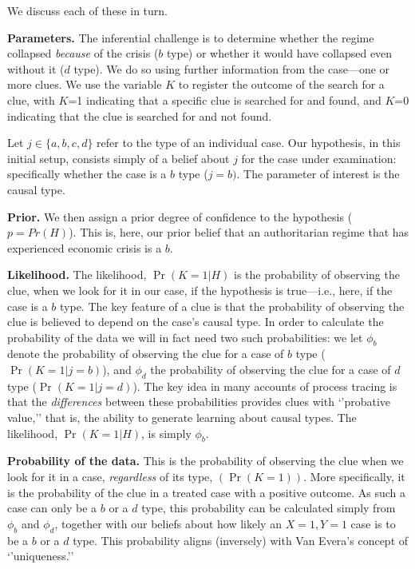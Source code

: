 \documentclass[
  12pt,
]{book}
\begin{document}
We discuss each of these in turn.

\textbf{Parameters.} The inferential challenge is to determine whether the regime collapsed \emph{because} of the crisis (\(b\) type) or whether it would have collapsed even without it (\(d\) type). We do so using further information from the case---one or more clues. We use the variable \(K\) to register the outcome of the search for a clue, with \(K\)=1 indicating that a specific clue is searched for and found, and \(K\)=0 indicating that the clue is searched for and not found.

Let \(j\in \{a,b,c,d\}\) refer to the type of an individual case. Our hypothesis, in this initial setup, consists simply of a belief about \(j\) for the case under examination: specifically whether the case is a \(b\) type (\(j=b)\). The parameter of interest is the causal type.

\textbf{Prior.} We then assign a prior degree of confidence to the hypothesis (\(p = Pr(H)\)). This is, here, our prior belief that an authoritarian regime that has experienced economic crisis is a \(b\).

\textbf{Likelihood.} The likelihood, \(\Pr(K=1|H)\) is the probability of observing the clue, when we look for it in our case, if the hypothesis is true---i.e., here, if the case is a \(b\) type. The key feature of a clue is that the probability of observing the clue is believed to depend on the case's causal type. In order to calculate the probability of the data we will in fact need two such probabilities: we let \(\phi_b\) denote the probability of observing the clue for a case of \(b\) type (\(\Pr(K=1|j=b)\)), and \(\phi_d\) the probability of observing the clue for a case of \(d\) type (\(\Pr(K=1|j=d)\)). The key idea in many accounts of process tracing is that the \emph{differences} between these probabilities provides clues with `'probative value,'' that is, the ability to generate learning about causal types. The likelihood, \(\Pr(K=1|H)\), is simply \(\phi_b\).

\textbf{Probability of the data.} This is the probability of observing the clue when we look for it in a case, \emph{regardless} of its type, \((\Pr(K=1))\). More specifically, it is the probability of the clue in a treated case with a positive outcome. As such a case can only be a \(b\) or a \(d\) type, this probability can be calculated simply from \(\phi_b\) and \(\phi_d\), together with our beliefs about how likely an \(X=1, Y=1\) case is to be a \(b\) or a \(d\) type.
This probability aligns (inversely) with Van Evera's concept of `'uniqueness.''
\end{document}
